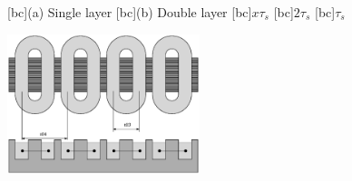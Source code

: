 \begin{psfrags}%
\psfragscanon

[bc]{(a) Single layer}
[bc]{(b) Double layer}
[bc]{$x \tau_s$}
[bc]{$2\tau_s$}
[bc]{$\tau_s$}

\includegraphics[width=0.42\textwidth]{figs/f_concen_coils-a.eps}
\end{psfrags}%